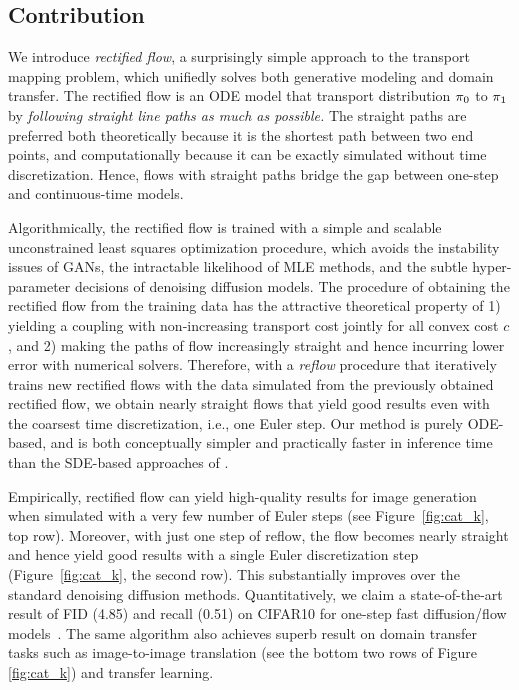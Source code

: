 \subsection*{Contribution}
We introduce 
\emph{rectified flow}, 
a surprisingly  
simple approach  
to the transport mapping problem, 
which unifiedly solves both 
generative modeling and domain transfer. 
The rectified flow 
is an ODE model 
that transport 
distribution ${\pi}_0$ to ${\pi}_1$
by 
\emph{following straight line paths as much as possible.} 
The straight paths 
are preferred both theoretically 
because it is the shortest path 
between two end points, 
and computationally because it can be 
exactly simulated without time discretization. 
Hence,
 flows  with straight paths 
bridge the gap between one-step and continuous-time models. %

Algorithmically, the rectified flow 
is trained with 
a simple and scalable unconstrained 
least squares optimization procedure,    which 
avoids the instability issues of GANs,  
the intractable likelihood of MLE methods, and the subtle hyper-parameter decisions of denoising diffusion models.  
The procedure of obtaining the rectified flow from the training data has the attractive theoretical property of 
1) yielding a coupling with 
non-increasing transport cost jointly for all convex cost $c$, 
and 2) making the paths of flow increasingly straight and hence incurring lower error with numerical solvers.
Therefore, 
with a \emph{reflow} 
procedure that iteratively trains new 
rectified flows
with the data simulated from the previously obtained rectified flow, 
we obtain nearly straight flows 
that yield good results even with
the coarsest time discretization, i.e., 
one Euler step. 
Our method is purely ODE-based, 
and is both conceptually simpler and practically faster in inference time than the SDE-based approaches of
\cite{ho2020denoising, song2020score, song2020denoising}. 

Empirically, 
rectified flow 
can yield
high-quality results 
for image generation when simulated with a very few number of Euler steps (see Figure~\ref{fig:cat_k}, top row).
Moreover, with just one step of reflow, 
the flow becomes nearly straight and hence yield good results with a single Euler discretization step (Figure~\ref{fig:cat_k}, the second row).
This substantially improves 
over the standard denoising diffusion methods. %
Quantitatively, we claim a state-of-the-art result of FID (4.85) and recall (0.51) on CIFAR10 for one-step fast diffusion/flow models~\citep{bao2022analytic, lyu2022accelerating, xiao2021tackling, zheng2022truncated, luhman2021knowledge}. 
The same algorithm 
also achieves superb result on domain transfer tasks such as image-to-image translation (see the bottom two rows of Figure \ref{fig:cat_k}) and 
transfer learning. 






